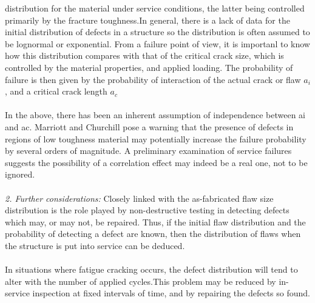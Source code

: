 \documentclass[12pt]{article}
\begin{document}
distribution for the material under service conditions, the latter being controlled
primarily by the fracture toughness.In general, there is a lack of data for
the initial distribution of defects in a structure so the distribution is often assumed to
be lognormal or exponential. From a failure point of view, it is importanl to know
how this distribution compares with that of the critical crack size, which is
controlled by the material properties, and applied loading. The probability of
failure is then given by the probability of interaction of the actual crack or flaw $a_i$,
and a critical crack length $a_{c}$\\\\
In the above, there has been an inherent assumption of independence between ai
and ac. Marriott and Churchill pose a warning that the presence of defects in
regions of low toughness material may potentially increase the failure probability by
several orders of magnitude. A preliminary examination of service failures suggests
the possibility of a correlation effect may indeed be a real one, not to be ignored.\\\\
{\it 2. Further considerations: }Closely linked with the as-fabricated flaw size distribution is the role played by
non-destructive testing in detecting defects which may, or may not, be repaired.
Thus, if the initial flaw distribution and the probability of detecting a defect are
known, then the distribution of flaws when the structure is put into service can be
deduced.\\\\
In situations where fatigue cracking occurs, the defect distribution will tend to
alter with the number of applied cycles.This
problem may be reduced by in-service inspection at fixed intervals of time, and by
repairing the defects so found.
\end{document}
